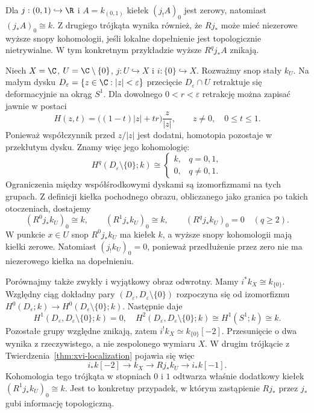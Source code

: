 \begin{przyklad}[Dlaczego $j_!\ne j_*$?]
Dla $j:(0,1)\hookrightarrow\R$ i $A=k_{(0,1)}$
kiełek $(j_!A)_0$ jest zerowy, natomiast
$(j_*A)_0\cong k$. Z drugiego trójkąta wynika również,
że $Rj_*$ może mieć niezerowe wyższe snopy kohomologii,
jeśli lokalne dopełnienie jest topologicznie nietrywialne.
W tym konkretnym przykładzie wyższe $R^qj_*A$ znikają.
\end{przyklad}


\begin{przyklad}
\label{prz:xvi-punctured-disc-audit}
Niech $X=\C$, $U=\C\setminus\{0\}$,
$j:U\hookrightarrow X$ i $i:\{0\}\hookrightarrow X$.
Rozważmy snop stały $k_U$.
Na małym dysku $D_\varepsilon=\{z\in\C:|z|<\varepsilon\}$
przecięcie $D_\varepsilon\cap U$ retraktuje się
deformacyjnie na okrąg $S^1$.
Dla dowolnego $0<r<\varepsilon$ retrakcję
można zapisać jawnie w postaci
\[
 H(z,t)=\bigl((1-t)|z|+tr\bigr)\frac{z}{|z|},
 \qquad z\ne0,\quad 0\le t\le1.
\]
Ponieważ współczynnik przed $z/|z|$ jest dodatni,
homotopia pozostaje w przekłutym dysku.
Znamy więc jego kohomologię:
\[
 H^q(D_\varepsilon\setminus\{0\};k)
 \cong
 \begin{cases}
 k,&q=0,1,\\
 0,&q\ne0,1.
 \end{cases}
\]
Ograniczenia między współśrodkowymi dyskami
są izomorfizmami na tych grupach. Z definicji
kiełka pochodnego obrazu, obliczanego jako granica
po takich otoczeniach, dostajemy
\[
 (R^0j_*k_U)_0\cong k,\qquad
 (R^1j_*k_U)_0\cong k,\qquad
 (R^qj_*k_U)_0=0\quad(q\ge2).
\]
W punkcie $x\in U$ snop $R^0j_*k_U$ ma kiełek $k$,
a wyższe snopy kohomologii mają kiełki zerowe.
Natomiast $(j_!k_U)_0=0$, ponieważ przedłużenie
przez zero nie ma niezerowego kiełka na dopełnieniu.

Porównajmy także zwykły i wyjątkowy obraz odwrotny.
Mamy $i^*k_X\cong k_{\{0\}}$. Względny ciąg dokładny
pary $(D_\varepsilon,D_\varepsilon\setminus\{0\})$
rozpoczyna się od izomorfizmu $H^0(D_\varepsilon;k)
\to H^0(D_\varepsilon\setminus\{0\};k)$.
Następnie daje
\[
 H^1(D_\varepsilon,D_\varepsilon\setminus\{0\};k)=0,
 \quad
 H^2(D_\varepsilon,D_\varepsilon\setminus\{0\};k)
 \cong H^1(S^1;k)\cong k.
\]
Pozostałe grupy względne znikają, zatem
$i^!k_X\simeq k_{\{0\}}[-2]$.
Przesunięcie o dwa wynika z rzeczywistego,
a nie zespolonego wymiaru $X$.
W drugim trójkącie z
Twierdzenia~\ref{thm:xvi-localization}
pojawia się więc
\[
 i_*k[-2]\longrightarrow k_X
 \longrightarrow Rj_*k_U\longrightarrow i_*k[-1].
\]
Kohomologia tego trójkąta w stopniach $0$ i $1$
odtwarza właśnie dodatkowy kiełek
$(R^1j_*k_U)_0\cong k$. Jest to konkretny
przypadek, w którym zastąpienie $Rj_*$ przez $j_*$
gubi informację topologiczną.
\end{przyklad}

